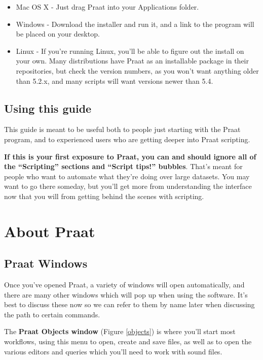 \documentclass[11pt]{article}
\begin{document}
\begin{itemize}
\item
  Mac OS X - Just drag Praat into your Applications folder.
\item
  Windows - Download the installer and run it, and a link to the program
  will be placed on your desktop.
\item
  Linux - If you're running Linux, you'll be able to figure out the
  install on your own. Many distributions have Praat as an installable
  package in their repositories, but check the version numbers, as you
  won't want anything older than 5.2.x, and many scripts will want
  versions newer than 5.4.
\end{itemize}

\hypertarget{using-this-guide}{%
\subsection{Using this guide}\label{using-this-guide}}

This guide is meant to be useful both to people just starting with the
Praat program, and to experienced users who are getting deeper into
Praat scripting.

\textbf{If this is your first exposure to Praat, you can and should
ignore all of the ``Scripting'' sections and ``Script tips!'' bubbles}.
That's meant for people who want to automate what they're doing over
large datasets. You may want to go there someday, but you'll get more
from understanding the interface now that you will from getting behind
the scenes with scripting.

\hypertarget{about-praat}{%
\section{About Praat}\label{about-praat}}

\hypertarget{praat-windows}{%
\subsection{Praat Windows}\label{praat-windows}}

Once you've opened Praat, a variety of windows will open automatically,
and there are many other windows which will pop up when using the
software. It's best to discuss these now so we can refer to them by name
later when discussing the path to certain commands.

The \textbf{Praat Objects window} (Figure \ref{objects}) is where you'll
start most workflows, using this menu to open, create and save files, as
well as to open the various editors and queries which you'll need to
work with sound files.
\end{document}
